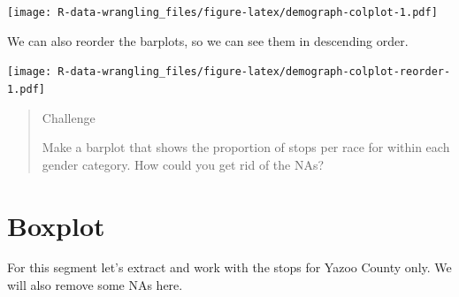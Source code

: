 \documentclass[]{book}
\newenvironment{Shaded}{\begin{snugshade}}{\end{snugshade}}
\newcommand{\CommentTok}[1]{\textcolor[rgb]{0.56,0.35,0.01}{\textit{#1}}}
\newcommand{\DataTypeTok}[1]{\textcolor[rgb]{0.13,0.29,0.53}{#1}}
\newcommand{\KeywordTok}[1]{\textcolor[rgb]{0.13,0.29,0.53}{\textbf{#1}}}
\newcommand{\NormalTok}[1]{#1}
\newcommand{\OperatorTok}[1]{\textcolor[rgb]{0.81,0.36,0.00}{\textbf{#1}}}
\newcommand{\OtherTok}[1]{\textcolor[rgb]{0.56,0.35,0.01}{#1}}
\newcommand{\StringTok}[1]{\textcolor[rgb]{0.31,0.60,0.02}{#1}}
\begin{document}
\texttt{[image: R-data-wrangling\_files/figure-latex/demograph-colplot-1.pdf]}

We can also reorder the barplots, so we can see them in descending order.

\begin{Shaded}
\end{Shaded}

\texttt{[image: R-data-wrangling\_files/figure-latex/demograph-colplot-reorder-1.pdf]}

\begin{quote}
Challenge

Make a barplot that shows the proportion of stops per race for within each gender category. How could you get rid of the NAs?
\end{quote}

\hypertarget{boxplot}{%
\section{Boxplot}\label{boxplot}}

For this segment let's extract and work with the stops for Yazoo County only. We will also remove some NAs here.

\begin{Shaded}
\end{Shaded}
\end{document}
